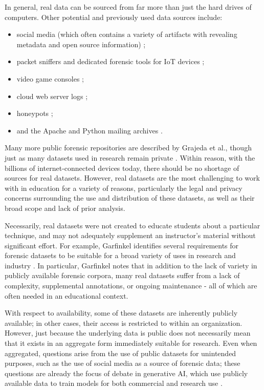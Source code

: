 \documentclass[letterpaper,12pt]{report}
\def\tightlist{}
\begin{document}
In general, real data can be sourced from far more than just the hard
drives of computers. Other potential and previously used data sources
include:

\begin{itemize}
\tightlist
\item
  social media (which often contains a variety of artifacts with
  revealing metadata and open source information)
  \cite{baggiliDataSourcesAdvancing2015};
\item
  packet sniffers and dedicated forensic tools for IoT devices
  \cite{meffertForensicStateAcquisition2017};
\item
  video game consoles
  \cite{grajedaAvailabilityDatasetsDigital2017,pessolanoForensicAnalysisNintendo2019};
\item
  cloud web server logs \cite{rahmanNewWebForensic2020};
\item
  honeypots \cite{mochForensicImageGenerator2009};
\item
  and the Apache and Python mailing archives
  \cite{grajedaAvailabilityDatasetsDigital2017}.
\end{itemize}

Many more public forensic repositories are described by Grajeda et al.,
though just as many datasets used in research remain private
\cite{grajedaAvailabilityDatasetsDigital2017}. Within reason, with
the billions of internet-connected devices today, there should be no
shortage of sources for real datasets. However, real datasets are the
most challenging to work with in education for a variety of reasons,
particularly the legal and privacy concerns surrounding the use and
distribution of these datasets, as well as their broad scope and lack of
prior analysis.

Necessarily, real datasets were not created to educate students about a
particular technique, and may not adequately supplement an instructor's
material without significant effort. For example, Garfinkel identifies
several requirements for forensic datasets to be suitable for a broad
variety of uses in research and industry
\cite{garfinkelForensicCorporaChallenge2007}. In particular,
Garfinkel notes that in addition to the lack of variety in publicly
available forensic corpora, many real datasets suffer from a lack of
complexity, supplemental annotations, or ongoing maintenance - all of
which are often needed in an educational context.

With respect to availability, some of these datasets are inherently
publicly available; in other cases, their access is restricted to within
an organization. However, just because the underlying data is public
does not necessarily mean that it exists in an aggregate form
immediately suitable for research. Even when aggregated, questions arise
from the use of public datasets for unintended purposes, such as the use
of social media as a source of forensic data; these questions are
already the focus of debate in generative AI, which use publicly
available data to train models for both commercial and research use
\cite{avrahamiOwnershipCreativityGenerative2021,eshraghianHumanOwnershipArtificial2020,rooseAIgeneratedPictureWon2022}.
\end{document}
